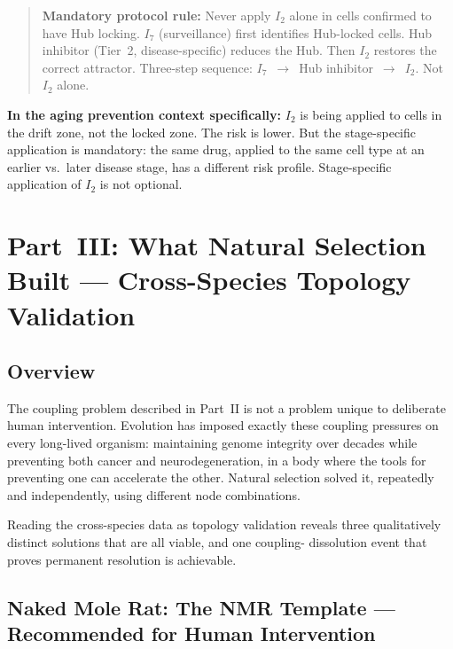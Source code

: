 \documentclass[12pt,a4paper]{article}
\newcommand{\Inet}[1]{$I_{#1}$}
\begin{document}
\begin{quote}
\textbf{Mandatory protocol rule:} Never apply \Inet{2} alone in cells
confirmed to have Hub locking. \Inet{7} (surveillance) first identifies
Hub-locked cells. Hub inhibitor (Tier~2, disease-specific) reduces the
Hub. Then \Inet{2} restores the correct attractor. Three-step sequence:
\Inet{7}~$\to$~Hub inhibitor~$\to$~\Inet{2}. Not \Inet{2} alone.
\end{quote}

\textbf{In the aging prevention context specifically:} \Inet{2} is being
applied to cells in the drift zone, not the locked zone. The risk is lower.
But the stage-specific application is mandatory: the same drug, applied to
the same cell type at an earlier vs.\ later disease stage, has a different
risk profile. Stage-specific application of \Inet{2} is not optional.

\section{Part~III: What Natural Selection Built --- Cross-Species
Topology Validation}

\subsection{Overview}

The coupling problem described in Part~II is not a problem unique to
deliberate human intervention. Evolution has imposed exactly these coupling
pressures on every long-lived organism: maintaining genome integrity over
decades while preventing both cancer and neurodegeneration, in a body where
the tools for preventing one can accelerate the other. Natural selection
solved it, repeatedly and independently, using different node combinations.

Reading the cross-species data as topology validation reveals three
qualitatively distinct solutions that are all viable, and one coupling-
dissolution event that proves permanent resolution is achievable.

\subsection{Naked Mole Rat: The NMR Template --- Recommended for Human Intervention}
\end{document}
